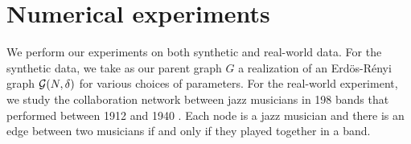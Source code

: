 

\section{Numerical experiments} \label{sec:experiments}

We perform our experiments on both synthetic and real-world data. For the synthetic data, we take as our parent graph $ G $ a realization of an Erd\"os-R\'enyi graph $ {\mathcal{G}}(N, \delta) $ for various choices of parameters. For the real-world experiment, we study the collaboration network between jazz musicians in 198 bands that performed between 1912 and 1940 \cite{gleiser2003community}. Each node is a jazz musician and there is an edge between two musicians if and only if they played together in a band.

